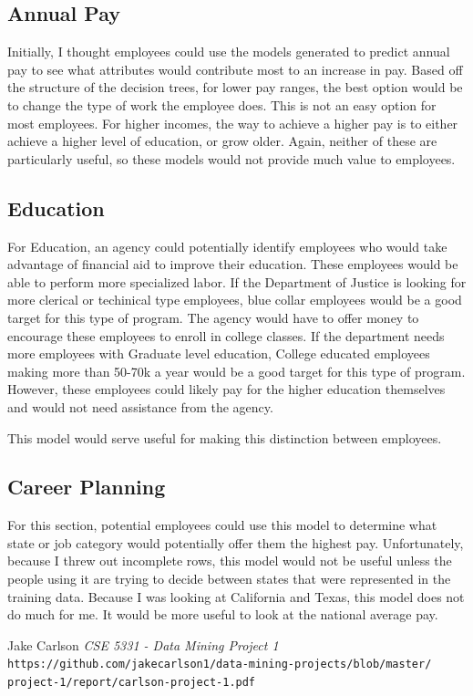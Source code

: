 \documentclass{article}
\begin{document}
    \subsection{Annual Pay}
    Initially, I thought employees could use the models generated to predict annual pay to see what attributes would contribute most to an increase in pay. Based off the structure of the decision trees, for lower pay ranges, the best option would be to change the type of work the employee does. This is not an easy option for most employees. For higher incomes, the way to achieve a higher pay is to either achieve a higher level of education, or grow older. Again, neither of these are particularly useful, so these models would not provide much value to employees.

    \subsection{Education}
    For Education, an agency could potentially identify employees who would take advantage of financial aid to improve their education. These employees would be able to perform more specialized labor. If the Department of Justice is looking for more clerical or techinical type employees, blue collar employees would be a good target for this type of program. The agency would have to offer money to encourage these employees to enroll in college classes. If the department needs more employees with Graduate level education, College educated employees making more than 50-70k a year would be a good target for this type of program. However, these employees could likely pay for the higher education themselves and would not need assistance from the agency.
    \par
    This model would serve useful for making this distinction between employees.

    \subsection{Career Planning}
    For this section, potential employees could use this model to determine what state or job category would potentially offer them the highest pay. Unfortunately, because I threw out incomplete rows, this model would not be useful unless the people using it are trying to decide between states that were represented in the training data. Because I was looking at California and Texas, this model does not do much for me. It would be more useful to look at the national average pay.

\begin{thebibliography}{10}
    Jake Carlson
    \textit{CSE 5331 - Data Mining Project 1}
    \texttt{https://github.com/jakecarlson1/data-mining-projects/blob/master/}
    \texttt{project-1/report/carlson-project-1.pdf}

\end{thebibliography}
\end{document}
